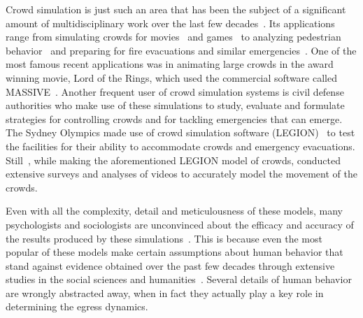 Crowd simulation is just such an area that has been the subject of a significant amount of multidisciplinary work over the last few decades~\cite{Still:2000tp,Zhou:2010:CMS:1842722.1842725,Gwynne:1999vi}. Its applications range from simulating crowds for movies~\cite{Regelous:2011vt,Reynolds:1987vm} and games~\cite{Snape:2012,ageOfEmpires:2013} to analyzing pedestrian behavior~\cite{PhysRevE.51.4282,Viswanathan:ut,Guy:2010uv} and preparing for fire evacuations and similar emergencies~\cite{Klupfel:2005to,PEDFull:2011,Mordvintsev:2012}. One of the most famous recent applications was in animating large crowds in the award winning movie, Lord of the Rings, which used the commercial software called MASSIVE~\cite{Regelous:2011vt}. Another frequent user of crowd simulation systems is civil defense authorities who make use of these simulations to study, evaluate and formulate strategies for controlling crowds and for tackling emergencies that can emerge. The Sydney Olympics made use of crowd simulation software (LEGION)~\cite{Still:2000tp} to test the facilities for their ability to accommodate crowds and emergency evacuations. Still~\cite{Still:2000tp}, while making the aforementioned LEGION model of crowds, conducted extensive surveys and analyses of videos to accurately model the movement of the crowds.

Even with all the complexity, detail and meticulousness of these models, many psychologists and sociologists are unconvinced about the efficacy and accuracy of the results produced by these simulations~\cite{Aguirre:2004tn,Torres:2010tj,Sime:1995uu}. This is because even the most popular of these models make certain assumptions about human behavior that stand against evidence obtained over the past few decades through extensive studies in the social sciences and humanities~\cite{Torres:2010tj,Sime:1995uu}. Several details of human behavior are wrongly abstracted away, when in fact they actually play a key role in determining the egress dynamics.


